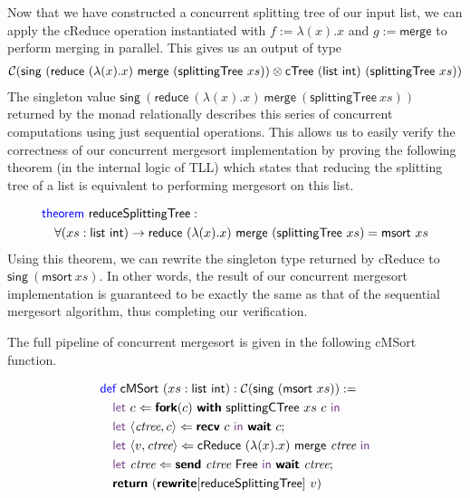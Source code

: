 Now that we have constructed a concurrent splitting tree of our input list, we can
apply the \textsf{cReduce} operation instantiated with $f := \lambda(x). x$
and $g := \textsf{merge}$ to perform merging in parallel.
This gives us an output of type
\begin{align*}
  \CM{\textsf{sing}\ (\textsf{reduce}\ (\lambda(x). x)\ \textsf{merge}\ (\textsf{splittingTree}\ xs)) \otimes \textsf{cTree}\ (\textsf{list}\ \textsf{int})\ (\textsf{splittingTree}\ xs)} 
\end{align*}
The singleton value 
$\textsf{sing}\ (\textsf{reduce}\ (\lambda(x). x)\ \textsf{merge}\ (\textsf{splittingTree}\ xs))$
returned by the monad relationally describes this series of concurrent computations using just 
sequential operations. This allows us to easily verify the correctness of our concurrent mergesort
implementation by proving the following theorem (in the internal logic of TLL) which states that 
reducing the splitting tree of a list is equivalent to performing mergesort on this list.

\vspace{-1em}
\begingroup
\small
\addtolength{\jot}{-0.2em}
\begin{align*}
  &\Theorem\ \textsf{reduceSplittingTree} : \\
  &\quad\forall (xs : \textsf{list}\ \textsf{int}) \rightarrow \textsf{reduce}\ (\lambda(x). x)\ \textsf{merge}\ (\textsf{splittingTree}\ xs) = \textsf{msort}\ xs
\end{align*}
\endgroup
Using this theorem, we can rewrite the singleton type returned by \textsf{cReduce} to
$\textsf{sing}\ (\textsf{msort}\ xs)$. In other words, the result of our concurrent
mergesort implementation is guaranteed to be exactly the same as that of the sequential
mergesort algorithm, thus completing our verification.

The full pipeline of concurrent mergesort is given in the following \textsf{cMSort} function.

\vspace{-1em}
\begingroup
\small
\addtolength{\jot}{-0.2em}
\begin{align*}
  &\Def\ \textsf{cMSort}\ (xs : \textsf{list}\ \textsf{int}) : \CM{\textsf{sing}\ (\textsf{msort}\ xs)} := \\
  &\quad\Let\ c \Leftarrow \Fork(c)\ \With\ \textsf{splittingCTree}\ xs\ c\ \In \\ 
  &\quad\Let\ \langle{\textit{ctree}, c}\rangle \Leftarrow \Recv\ c\ \In\ \Wait\ c; \\
  &\quad\Let\ \langle{v, \textit{ctree}}\rangle \Leftarrow \textsf{cReduce}\ (\lambda(x). x)\ \textsf{merge}\ \textit{ctree}\ \In \\
  &\quad\Let\ \textit{ctree} \Leftarrow \Send\ \textit{ctree}\ \textsf{Free}\ \In\ \Wait\ \textit{ctree}; \\
  &\quad\Return\ (\Rewrite[\textsf{reduceSplittingTree}]\ v)
\end{align*}
\endgroup


